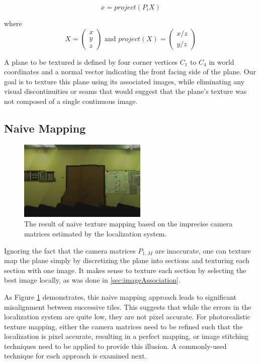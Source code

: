 \documentclass[10pt,twocolumn,letterpaper]{article}
\begin{document}
\[
x=project(P_iX)
\]

where
\[X = \begin{pmatrix} x \\ y \\ z \end{pmatrix} \textrm{ and }
project(X) = \begin{pmatrix} x/z \\ y/z \end{pmatrix}
\]

A plane to be textured is defined by four corner vertices $C_1$ to $C_4$ in
world coordinates and a normal vector indicating the front facing side
of the plane. Our goal is to texture this plane using its associated
images, while eliminating any visual discontinuities or seams that
would suggest that the plane's texture was not composed of a single
continuous image.



\subsection{Naive Mapping}
\label{sec:naive}
\begin{figure}
  \centering
  \includegraphics[height=1.5in]{naive.png}
  \caption{The result of naive texture mapping based on the imprecise
    camera matrices estimated by the localization system.}
  \label{fig:naive}
\end{figure}


Ignoring the fact that the camera matrices $P_{1..M}$ are inaccurate,
one can texture map the plane simply by discretizing the plane into
sections and texturing each section with one image. It makes sense to
texture each section by selecting the best image locally, as was done
in \ref{sec:imageAssociation}.

As Figure \ref{fig:naive} demonstrates, this naive mapping approach
leads to significant misalignment between successive tiles. This
suggests that while the errors in the localization system are quite
low, they are not pixel accurate. For photorealistic texture mapping,
either the camera matrices need to be refined such that the
localization is pixel accurate, resulting in a perfect mapping, or
image stitching techniques need to be applied to provide this
illusion. A commonly-used technique for each approach is examined
next.
\end{document}
